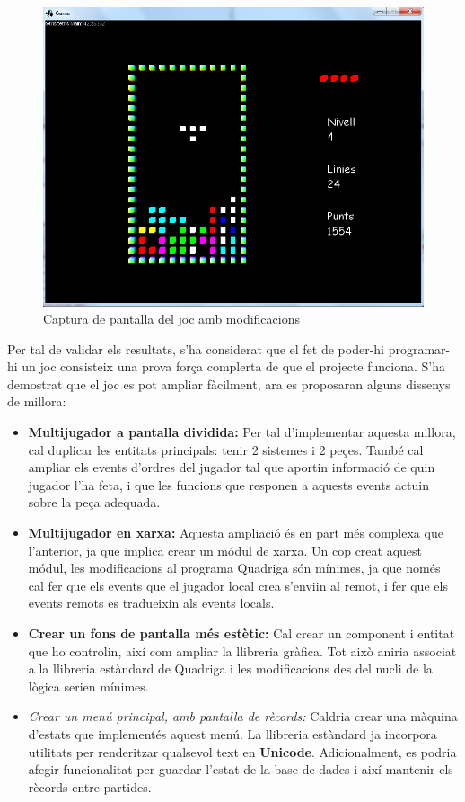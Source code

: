   \begin{figure}
    \centering
    \includegraphics[width=0.5\linewidth]{./img/ImatgePecaSeguent.png}
    \caption{Captura de pantalla del joc amb modificacions \label{fig:ImatgePecaSeguent}}
  \end{figure}

  Per tal de validar els resultats, s'ha considerat que el fet de poder-hi programar-hi un joc consisteix una prova força complerta de que el projecte funciona. S'ha demostrat que el joc es pot ampliar fàcilment, ara es proposaran alguns dissenys de millora:
  
  \begin{itemize}
    \item {\bf Multijugador a pantalla dividida:} Per tal d'implementar aquesta millora, cal duplicar les entitats principals: tenir 2 sistemes i 2 peçes. També cal ampliar els events d'ordres del jugador tal que aportin informació de quin jugador l'ha feta, i que les funcions que responen a aquests events actuin sobre la peça adequada.
    
    \item {\bf Multijugador en xarxa:} Aquesta ampliació és en part més complexa que l'anterior, ja que implica crear un módul de xarxa. Un cop creat aquest módul, les modificacions al programa Quadriga són mínimes, ja que només cal fer que els events que el jugador local crea s'enviin al remot, i fer que els events remots es tradueixin als events locals.
    
    \item {\bf Crear un fons de pantalla més estètic:} Cal crear un component i entitat que ho controlin, així com ampliar la llibreria gràfica. Tot això aniria associat a la llibreria estàndard de Quadriga i les modificacions des del nucli de la lògica serien mínimes.
    
    \item {\em Crear un menú principal, amb pantalla de rècords:} Caldria crear una màquina d'estats que implementés aquest menú. La llibreria estàndard ja incorpora utilitats per renderitzar qualsevol text en {\bf Unicode}. Adicionalment, es podria afegir funcionalitat per guardar l'estat de la base de dades i així mantenir els rècords entre partides.
  \end{itemize}

  